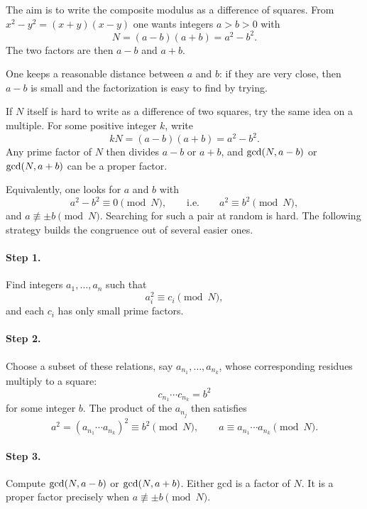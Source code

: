 The aim is to write the composite modulus as a difference of squares.
From $x^{2}-y^{2}=(x+y)(x-y)$ one wants integers $a>b>0$ with
\[
    N=(a-b)(a+b)=a^{2}-b^{2}.
\]
The two factors are then $a-b$ and $a+b$.


One keeps a reasonable distance between $a$ and $b$: if they are very
close, then $a-b$ is small and the factorization is easy to find by
trying.

If $N$ itself is hard to write as a difference of two squares, try the
same idea on a multiple. For some positive integer $k$, write
\[
    kN=(a-b)(a+b)=a^{2}-b^{2}.
\]
Any prime factor of $N$ then divides $a-b$ or $a+b$, and
$\operatorname{gcd}(N,a-b)$ or $\operatorname{gcd}(N,a+b)$ can be a proper factor.

Equivalently, one looks for $a$ and $b$ with
\[
    a^{2}-b^{2}\equiv 0\pmod{N},
    \qquad\text{i.e.}\qquad
    a^{2}\equiv b^{2}\pmod{N},
\]
and $a\not\equiv \pm b\pmod{N}$. Searching for such a pair at random is
hard. The following strategy builds the congruence out of several easier
ones.

\paragraph{Step 1.}
Find integers $a_{1},\ldots,a_{n}$ such that
\[
    a_{i}^{2}\equiv c_{i}\pmod{N},
\]
and each $c_{i}$ has only small prime factors.

\paragraph{Step 2.}
Choose a subset of these relations, say
$a_{n_{1}},\ldots,a_{n_{k}}$, whose corresponding residues multiply to a
square:
\[
    c_{n_{1}}\cdots c_{n_{k}}=b^{2}
\]
for some integer $b$. The product of the $a_{n_{j}}$ then satisfies
\[
    a^{2}
    =(a_{n_{1}}\cdots a_{n_{k}})^{2}
    \equiv b^{2}\pmod{N},
    \qquad
    a\equiv a_{n_{1}}\cdots a_{n_{k}}\pmod{N}.
\]

\paragraph{Step 3.}
Compute $\operatorname{gcd}(N,a-b)$ or $\operatorname{gcd}(N,a+b)$. Either gcd is a factor of $N$.
It is a proper factor precisely when $a\not\equiv \pm b\pmod{N}$.


